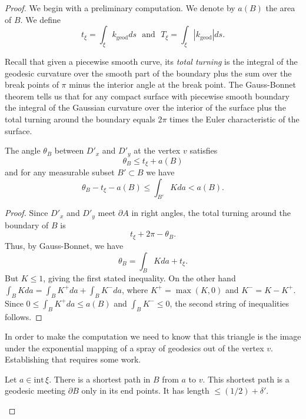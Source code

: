 \begin{proof}
We begin with a preliminary computation. We denote by $a(B)$ the
area of $B$. We define
$$t_{\xi}=\int_{\xi}k_\mathrm{geod}ds \ \ \ \text{and} \ \ \ T_\xi=\int_{\xi}|k_\mathrm{geod}|ds.$$

Recall that given a piecewise smooth curve, its {\em total turning}
is the integral of the geodesic curvature over the smooth part of
the boundary plus the sum over the break points of $\pi$ minus the
interior angle at the break point.  The Gauss-Bonnet theorem tells
us that for any compact surface with piecewise smooth boundary the
integral of the Gaussian curvature over the interior of the surface
plus the total turning around the boundary equals $2\pi$ times the
Euler characteristic of the surface.



\begin{claim}
\label{claim:focusing-triangle-angle-curvature-bound}
\label{theta/Kbd}
The angle $\theta_B$ between $D'_x$ and $D'_y$ at the vertex $v$
satisfies $$\theta_B\le t_\xi+a(B)$$ and for any measurable subset
$B'\subset B$ we have
$$\theta_B-t_\xi-a(B)\le \int_{B'}Kda<a(B).$$
\end{claim}

\begin{proof}
 Since $D'_x$ and
$D'_y$ meet $\partial A$ in right angles, the total turning around
the boundary of $B$  is
$$t_\xi+2\pi-\theta_B.$$
Thus, by Gauss-Bonnet, we have
$$\theta_B=\int_BKda+ t_\xi.$$
But $K\le 1$, giving the first stated inequality. On the other hand
$\int_BKda=\int_BK^+da+\int_BK^-da$, where $K^+=\max(K,0)$ and
$K^-=K-K^+$. Since $0\le \int_BK^+da\le a(B)$ and $\int_BK^-\le 0$,
the second string of inequalities follows.
\end{proof}

In order to make the computation we need to know that this triangle
is the image under the exponential mapping of a spray of geodesics
out of the vertex $v$. Establishing that requires some work.


\begin{claim}
\label{claim:focusing-triangle-vertex-geodesic}
\label{avgeo}
Let $a\in \mathrm{int}\,\xi$. There is a shortest path in $B$ from $a$
to $v$. This shortest path is a geodesic meeting $\partial B$ only
in its end points. It has length $\le(1/2)+\delta'$.
\end{claim}


\end{proof}
